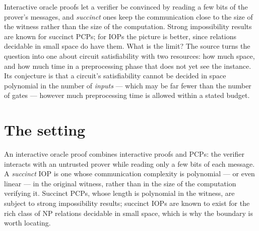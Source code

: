 \documentclass{aicr-conjecture}
\begin{document}

\vspace{0.4em}

\begin{informalconjecture}
Interactive oracle proofs let a verifier be convinced by reading a few
bits of the prover's messages, and \emph{succinct} ones keep the
communication close to the size of the witness rather than the size of
the computation. Strong impossibility results are known for succinct
PCPs; for IOPs the picture is better, since relations decidable in small
space do have them. What is the limit? The source turns the question into
one about circuit satisfiability with two resources: how much space, and
how much time in a preprocessing phase that does not yet see the
instance. Its conjecture is that a circuit's satisfiability cannot be
decided in space polynomial in the number of \emph{inputs} --- which may be
far fewer than the number of gates --- however much preprocessing time is
allowed within a stated budget.
\end{informalconjecture}

\section{The setting}\label{sec:setting}

An interactive oracle proof combines interactive proofs and PCPs: the
verifier interacts with an untrusted prover while reading only a few bits
of each message. A \emph{succinct} IOP is one whose communication
complexity is polynomial --- or even linear --- in the original witness,
rather than in the size of the computation verifying it. Succinct PCPs,
whose length is polynomial in the witness, are subject to strong
impossibility results; succinct IOPs are known to exist for the rich
class of NP relations decidable in small space, which is why the
boundary is worth locating.
\end{document}
